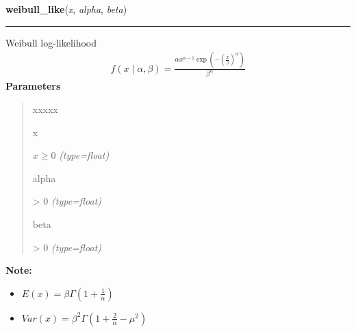     \label{pymc:distributions:weibull_like}

    \vspace{0.5ex}

\hspace{.8\funcindent}\begin{boxedminipage}{\funcwidth}

    \raggedright \textbf{weibull\_like}(\textit{x}, \textit{alpha}, \textit{beta})

    \vspace{-1.5ex}

    \rule{\textwidth}{0.5\fboxrule}
\setlength{\parskip}{2ex}

Weibull log-likelihood
\begin{equation*}\begin{split}f(x \mid \alpha, \beta) = \frac{\alpha x^{\alpha - 1}\exp(-(\frac{x}{\beta})^{\alpha})}{\beta^\alpha}\end{split}\end{equation*}\setlength{\parskip}{1ex}
      \textbf{Parameters}
      \vspace{-1ex}

      \begin{quote}
        \begin{Ventry}{xxxxx}

          \item[x]


$x \ge 0$
            {\it (type=float)}

          \item[alpha]


{\textgreater} 0
            {\it (type=float)}

          \item[beta]


{\textgreater} 0
            {\it (type=float)}

        \end{Ventry}

      \end{quote}

\textbf{Note:} \begin{itemize}
\item {} 
$E(x)=\beta \Gamma(1+\frac{1}{\alpha})$

\item {} 
$Var(x)=\beta^2 \Gamma(1+\frac{2}{\alpha} - \mu^2)$

\end{itemize}


    \end{boxedminipage}

